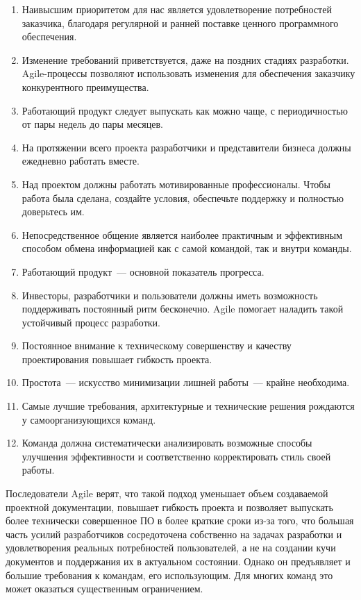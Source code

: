 \documentclass{../../text-style}
\begin{document}
\begin{enumerate}
    \item Наивысшим приоритетом для нас является удовлетворение потребностей заказчика, благодаря регулярной и ранней поставке ценного программного обеспечения.
    \item Изменение требований приветствуется, даже на поздних стадиях разработки. Agile-процессы позволяют использовать изменения для обеспечения заказчику конкурентного преимущества.
    \item Работающий продукт следует выпускать как можно чаще, с периодичностью от пары недель до пары месяцев.
    \item На протяжении всего проекта разработчики и представители бизнеса должны ежедневно работать вместе.
    \item Над проектом должны работать мотивированные профессионалы. Чтобы работа была сделана, создайте условия, обеспечьте поддержку и полностью доверьтесь им.
    \item Непосредственное общение является наиболее практичным и эффективным способом обмена информацией как с самой командой, так и внутри команды.
    \item Работающий продукт~--- основной показатель прогресса.
    \item Инвесторы, разработчики и пользователи должны иметь возможность поддерживать постоянный ритм бесконечно. Agile помогает наладить такой устойчивый процесс разработки.
    \item Постоянное внимание к техническому совершенству и качеству проектирования повышает гибкость проекта.
    \item Простота~--- искусство минимизации лишней работы~--- крайне необходима.
    \item Самые лучшие требования, архитектурные и технические решения рождаются у самоорганизующихся команд.
    \item Команда должна систематически анализировать возможные способы улучшения эффективности и соответственно корректировать стиль своей работы.
\end{enumerate}

Последователи Agile верят, что такой подход уменьшает объем создаваемой проектной документации, повышает гибкость проекта и позволяет выпускать более технически совершенное ПО в более краткие сроки из-за того, что большая часть усилий разработчиков сосредоточена собственно на задачах разработки и удовлетворения реальных потребностей пользователей, а не на создании кучи документов и поддержания их в актуальном состоянии. Однако он предъявляет и большие требования к командам, его использующим. Для многих команд это может оказаться существенным ограничением.
\end{document}
